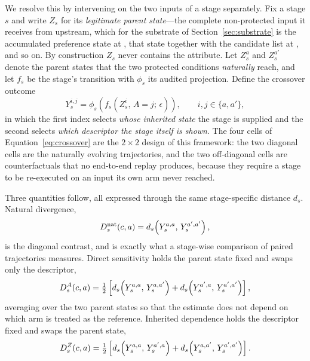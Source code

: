 We resolve this by intervening on the two inputs of a stage separately. Fix a stage $s$ and write
$Z_s$ for its \emph{legitimate parent state}---the complete non-protected input it receives from
upstream, which for the substrate of Section~\ref{sec:substrate} is the accumulated preference
state at , that state together with the candidate list at , and so on.
By construction $Z_s$ never contains the attribute. Let $Z^{a}_s$ and $Z^{a'}_s$ denote the parent
states that the two protected conditions \emph{naturally} reach, and let $f_s$ be the stage's
transition with $\phi_s$ its audited projection. Define the crossover outcome
\begin{equation}
  Y^{i,j}_s = \phi_s\!\left(f_s(Z^{i}_s,\, A = j;\, \epsilon)\right),
  \qquad i, j \in \{a, a'\},
  \label{eq:crossover}
  \label{eq:crossovercell}
\end{equation}
in which the first index selects \emph{whose inherited state} the stage is supplied and the second
selects \emph{which descriptor the stage itself is shown}. The four cells of
Equation~\eqref{eq:crossover} are the $2 \times 2$ design of this framework: the two diagonal
cells are the naturally evolving trajectories, and the two off-diagonal cells are counterfactuals
that no end-to-end replay produces, because they require a stage to be re-executed on an input its
own arm never reached.

Three quantities follow, all expressed through the same stage-specific distance $d_s$. Natural
divergence,
\begin{equation}
  D^{\mathrm{nat}}_s(c, a) = d_s\!\left(Y^{a,a}_s,\, Y^{a',a'}_s\right),
  \label{eq:dnat}
  \label{eq:natural}
\end{equation}
is the diagonal contrast, and is exactly what a stage-wise comparison of paired trajectories
measures. Direct sensitivity holds the parent state fixed and swaps only the descriptor,
\begin{equation}
  D^{A}_s(c, a) = \tfrac{1}{2}\left[
    d_s\!\left(Y^{a,a}_s,\, Y^{a,a'}_s\right) +
    d_s\!\left(Y^{a',a}_s,\, Y^{a',a'}_s\right)\right],
  \label{eq:ddirect}
  \label{eq:direct}
\end{equation}
averaging over the two parent states so that the estimate does not depend on which arm is treated
as the reference. Inherited dependence holds the descriptor fixed and swaps the parent state,
\begin{equation}
  D^{Z}_s(c, a) = \tfrac{1}{2}\left[
    d_s\!\left(Y^{a,a}_s,\, Y^{a',a}_s\right) +
    d_s\!\left(Y^{a,a'}_s,\, Y^{a',a'}_s\right)\right].
  \label{eq:dinherited}
  \label{eq:state}
\end{equation}

